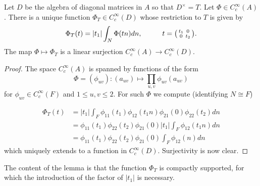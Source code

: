 \begin{lemma}\label{lemma:phiT}
    Let $D$ be the algebra of diagonal matrices in $A$ so that $D^\times =T$. Let $\Phi \in C_c^\infty(A)$. There is a unique function $\Phi_T \in C_c^\infty(D)$ whose restriction to $T$ is given by 
    $$\Phi_T(t) = |t_1| \int_N \Phi(tn)dn, \hspace{1cm} t=\begin{psmallmatrix}
        t_1 & 0\\0&t_2
    \end{psmallmatrix}.$$
    The map $\Phi \mapsto \Phi_T$ is a linear surjection $C_c^\infty(A) \to C_c^\infty (D)$.
\end{lemma}
\begin{proof}
    The space $C_c^\infty(A)$ is spanned by functions of the form 
    $$\Phi = (\phi_{uv}): (a_{uv}) \mapsto \prod\limits_{u,v} \phi_{uv}(a_{uv})$$
    for $\phi_{uv} \in C_c^\infty (F)$ and $1 \leq u,v \leq 2$. For such $\Phi$ we compute (identifying $N \cong F$)
    
    \begin{equation*}
        \begin{split}
            \Phi_T(t) &= |t_1| \int_F \phi_{11}(t_1)\phi_{12}(t_1n)\phi_{21}(0)\phi_{22}(t_2)dn \\
            &= \phi_{11}(t_1)\phi_{22}(t_2)\phi_{21}(0) |t_1|\int_F \phi_{12}(t_1n) dn \\
            &= \phi_{11}(t_1)\phi_{22}(t_2)\phi_{21}(0) \int_F \phi_{12}(n) dn
        \end{split}
    \end{equation*}
    which uniquely extends to a function in $C_c^\infty(D)$. Surjectivity is now clear.
\end{proof}
\begin{rem}
    The content of the lemma is that the function $\Phi_T$ is compactly supported, for which the introduction of the factor of $|t_1|$ is necessary.
\end{rem}

